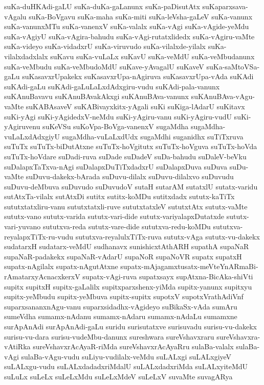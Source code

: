 {suKa-duHKAdi-gaLU
suKa-duKa-gaLanunx
suKa-paDisutAtx
suKaparxsava-vAgalu
suKa-BoVgavu
suKa-maha
suKa-miti
suKa-leVsha-gaLeV
suKa-vanunx
suKa-vanunxMTu
suKa-vanenxV
suKa-valalx
suKa-vAgi
suKa-vAgide-yeMdu
suKa-vAgiyU
suKa-vAgira-bahudu
suKa-vAgi-rutatxlidedx
suKa-vAgiru-vaMte
suKa-videyo
suKa-vidadxrU
suKa-viruvudo
suKa-vilalxde-yilalx
suKa-vilalxdadxlalx
suKavu
suKa-vuLaLx
suKavU
suKa-veMdU
suKa-veMbudanunx
suKa-veMbudu
suKa-veMbudoMdU
suKave-yAvagalU
suKaveV
suKa-saMtoVSa-gaLu
suKasavxrUpakekx
suKasavxrUpa-nAgiruva
suKasavxrUpa-vAda
suKAdi
suKAdi-gaLu
suKAdi-gaLuLaLxdAdxgiru-vudu
suKAdi-pala-vanunx
suKAnuBavavu
suKAnuBAvakAkxgi
suKAnuBAva-vanunx
suKAnuBAva-vAgu-vaMte
suKABAsaveV
suKABivayxkitx-yAgali
suKi
suKiga-lAdarU
suKitavx
suKi-yAgi
suKi-yAgidedxV-neMdu
suKi-yAgiru-vanu
suKi-yAgiru-vudU
suKi-yAgiruvenu
suKeVSu
suKoVpa-BoVga-vanenxV
sugaMdha
sugaMdha-vuLaLxdAdxgiyU
sugaMdha-vuLaLxdUdx
sugaMdhi
suganidhx
suTiTxruva
suTuTx
suTuTx-biDutAtxne
suTuTx-hoVgitutx
suTuTx-hoVguva
suTuTx-hoVda
suTuTx-hoVdare
suDadi-ruva
suDade
suDadeV
suDa-bahudu
suDaleV-beVku
suDalapxTaTxva-nAgi
suDalapxDuTiTxdadxrU
suDalapxDuva
suDuva
suDu-vaMte
suDuvu-dakekx-bArada
suDuvu-dilalx
suDuvu-dilalxvo
suDuvudu
suDuvu-deMbuva
suDuvudo
suDuvudoV
sutaH
sutarAM
sutatxlU
sutatx-varidu
sutAtxTa-vilalx
sutAtxDi
sutitx
sutitx-koMDu
sutitxdadx
sututx-kaTiTx
sututxtatxliru-vanu
sututxtatxli-ruve
sututxtatxleV
sututxtAtx
sututx-vaMte
sututx-vano
sututx-varida
sututx-vari-dide
sututx-variyalapxDutatxde
sututx-vari-yuvano
sututxva-reda
sututx-vare-dide
sututxva-redu-koMDu
sututxva-reyalapxTiTx-ru-vudu
sututxva-reyalulxTiTx-ruva
sututx-vAga
sututx-vu-dakekx
sudatarxH
sudatarx-veMdU
sudhanavx
sunishicxtAthARH
supathA
supaNaR
supaNaR-padakekx
supaNaR-vAdarU
supaNoR
supaNoVR
supatx
supatxH
supatx-nAgilalx
supatx-nAgutAtxne
supatx-mAjagamxtusatx-meVteYnARmaBi-rAmatarxyAcnacxkerxV
supatx-vAgi-ruva
supatxsayx
supAtxna-BicAka-shiVti
supitx
supitxH
supitx-gaLalilx
supitxparxshenx-yiMda
supitx-yanunx
supitxyu
supitx-yeMbudu
supitx-yeMbuva
supitx-supitx
supotxV
supotxVrathAdiVnf
suparxsananxnAgu-vanu
suparxsidadhx-vAgideyo
suBikaSx-vAda
sumAru
sumeVdha
sumamx-nAdanu
sumamx-nAdaru
sumamx-nAdaLu
sumamxne
surApAnAdi
surApAnAdi-gaLu
suridu
surisutatxve
surisuvadu
surisu-vu-dakekx
surisu-vu-dara
surisu-vudeMbu-danunx
sureshwara
sureVshavxraru
sureVshavxra-vAtiRka
sureVshavxrAcAyaR-riMda
sureVshavxrAcAyaRru
sulaBa-valalx
sulaBa-vAgi
sulaBa-vAgu-vudu
suLiyu-vudilalx-veMdu
suLALxgi
suLALxgiyeV
suLALxgu-vudu
suLALxdadadxriMdalU
suLALxdadxriMda
suLALxyiteMdU
suLuLx
suLeLx
suLeLxMdu
suLeLxMdeV
suLeLxV
suvaMte
suvagARya
}
